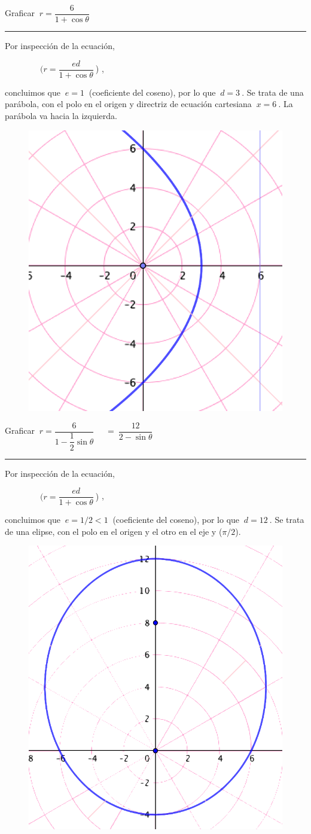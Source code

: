 \begin{miejercicio}

Graficar $\  r=\dfrac{6}{1+\cos \theta}$ 

 \rule{300pt}{0.2pt}

\begin{multicols}{2}
Por inspección de la ecuación, 

\textcolor{gris}{$\ \qquad \qquad (r=\dfrac{ed}{1+\cos \theta} \ $) },

concluimos que $\ e=1\ $ (coeficiente del coseno), por lo que $\ d=3 \ $. Se trata de una parábola, con el polo en el origen y directriz de ecuación cartesiana $\ x=6 \ $. La parábola va hacia la izquierda.
\begin{figure}[H]
	\centering
	\includegraphics[width=.25\textwidth]{img-polares/polares45.png}
\end{figure}
\vspace{2mm}
\end{multicols}

\end{miejercicio}


\begin{miejercicio} 
	
Graficar $\  r=\dfrac{6}{1-\dfrac 1 2 \sin \theta} $ \textcolor{gris}{$\quad = \ \dfrac{12}{2-\sin \theta}$} 

\rule{300pt}{0.2pt}

\begin{multicols}{2}
Por inspección de la ecuación, 

\textcolor{gris}{$\ \qquad \qquad (r=\dfrac{ed}{1+\cos \theta} \ $) },

concluimos que $\ e=1/2<1\ $ (coeficiente del coseno), por lo que $\ d=12 \ $. Se trata de una elipse, con el polo en el origen y el otro en el eje y ($\pi/2$).
\begin{figure}[H]
	\centering
	\includegraphics[width=.25\textwidth]{img-polares/polares46.png}
\end{figure}
\vspace{2mm}
\end{multicols}

\end{miejercicio}

